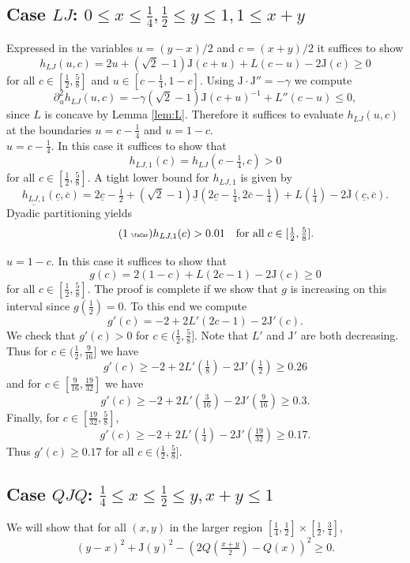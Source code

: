 \documentclass[11pt]{amsart}
\theoremstyle{plain}
\newcommand{\auto}{\tag{\addtocounter{equation}{1}\theequation\;{\tiny\faCar}}}
\theoremstyle{definition}
\theoremstyle{remark}
\numberwithin{equation}{section}
\begin{document}
\subsection{\texorpdfstring{Case $LJ$: $0 \leq x \leq \tfrac{1}{4}, \tfrac{1}{2}\leq y\leq 1, 1\leq x+y$}{Case LJ}}
\label{sec:caseLJ}
Expressed in the variables $u=(y-x)/2$ and $c=(x+y)/2$ it suffices to show
\[ h_{LJ}(u,c) = 2u + (\sqrt{2}-1){\mathrm{J}}(c+u)+L(c-u)-2{\mathrm{J}}(c)\ge 0 \]
for all $c\in [\frac12, \frac58]$ and $u\in [c-\frac14,1-c]$.
Using ${\mathrm{J}}\cdot {\mathrm{J}}''=-\gamma$ we compute
\[ \partial_u^2 h_{LJ}(u,c) = -\gamma(\sqrt{2}-1) {\mathrm{J}}(c+u)^{-1} + L''(c-u)\le 0, \]
since $L$ is concave by Lemma \ref{lem:L}.
Therefore it suffices to evaluate $h_{LJ}(u,c)$ at the boundaries $u=c-\frac14$ and $u=1-c$.\\

 $u=c-\frac14$. In this case it suffices to show that
\[ h_{LJ,1}(c) = h_{LJ}(c-\tfrac14,c)>0 \]
for all $c\in [\frac12,\frac58]$.
A tight lower bound for $h_{LJ,1}$ is given by
\[ \underline{h_{LJ,1}}(\underline c,\overline c) = 2\underline{c} - \tfrac12 + (\sqrt{2}-1) \underline{{\mathrm{J}}}(2\underline{c}-\tfrac14,2\overline{c}-\tfrac14) + L(\tfrac14) - 2 \overline{{\mathrm{J}}}(\underline c,\overline c).\]
Dyadic partitioning yields
\begin{equation}\label{eqn:h_LJ_1_auto}\auto
h_{LJ,1}(c) > 0.01\quad\text{for all}\; c\in [\tfrac12,\tfrac58].
\end{equation}

 $u=1-c$. In this case it suffices to show that
\[ g(c) = 2(1-c) + L(2c-1) - 2{\mathrm{J}}(c) \ge 0 \]
for all $c\in [\frac12,\frac58]$.
The proof is complete if we show that $g$ is increasing on this interval since $g(\frac12)=0$.
To this end we compute
\[ g'(c) = -2 + 2 L'(2c-1) - 2{\mathrm{J}}'(c). \]
We check that $g'(c)>0$ for $c\in (\frac12,\frac58]$. Note that $L'$ and ${\mathrm{J}}'$ are both decreasing.
Thus for $c\in(\frac12,\frac{9}{16}]$ we have
\[ g'(c) \ge -2 + 2 L'(\tfrac18) - 2 {\mathrm{J}}'(\tfrac12) \ge 0.26 \]
and for $c\in [\frac{9}{16}, \frac{19}{32}]$ we have
\[ g'(c) \ge -2 + 2 L'(\tfrac3{16}) - 2 {\mathrm{J}}'(\tfrac{9}{16}) \ge 0.3 .\]
Finally, for $c\in [\frac{19}{32},\frac58]$,
\[ g'(c) \ge -2 + 2 L'(\tfrac14) - 2 {\mathrm{J}}'(\tfrac{19}{32}) \ge 0.17. \]
Thus $g'(c)\ge 0.17$ for all $c\in(\frac12,\frac58]$.

\subsection{\texorpdfstring{Case $QJQ$: $\frac14\leq x\leq \frac12\leq y, x+y\leq 1$}{Case QJQ}}
\label{sec:caseQJQ}
We will show that for all $(x,y)$ in the larger region $[\frac14,\frac12]\times [\frac12,\frac34]$,
\begin{equation}\label{eqn:QJQclaim}
(y-x)^2 + {\mathrm{J}}(y)^2 - (2Q(\tfrac{x+y}{2})-Q(x))^2 \geq 0.
\end{equation}
\end{document}
